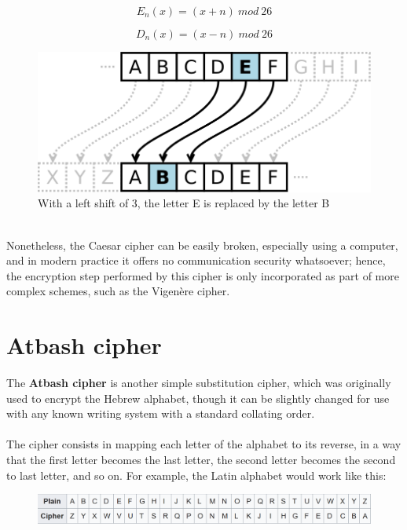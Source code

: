 \documentclass[Lau,binding=0.6cm,oneside]{sapthesis}
\begin{document}
\begin{equation}
E_{n}({x}) = (x + n) \ mod \ 26
\end{equation}

\begin{equation}
D_{n}({x}) = (x - n) \ mod \ 26
\end{equation}

\newpage

\begin{figure}[H]
\includegraphics[scale=0.34]{caesar_cipher}
\centering
\caption{With a left shift of 3, the letter E is replaced by the letter B}
\centering
\end{figure}

\ \\
Nonetheless, the Caesar cipher can be easily broken, especially using a computer, and in modern practice it offers no communication security whatsoever; hence, the encryption step performed by this cipher is only incorporated as part of more complex schemes, such as the Vigenère cipher.

\section{Atbash cipher}
The \textbf{Atbash cipher} is another simple substitution cipher, which was originally used to encrypt the Hebrew alphabet, though it can be slightly changed for use with any known writing system with a standard collating order.\\\\
The cipher consists in mapping each letter of the alphabet to its reverse, in a way that the first letter becomes the last letter, the second letter becomes the second to last letter, and so on. For example, the Latin alphabet would work like this: \\

\begin{figure}[H]
\includegraphics[scale=0.65]{atbash_cipher}
\centering
\caption{}
\centering
\end{figure}
\end{document}
